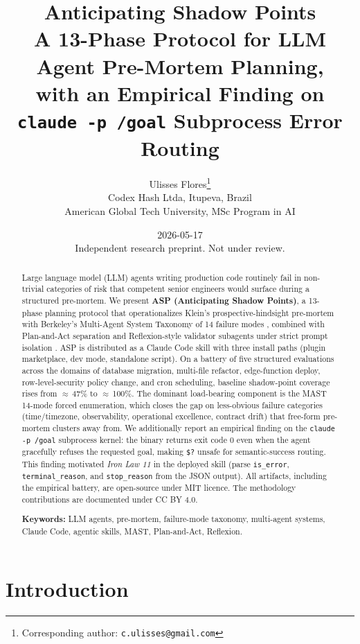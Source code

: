 \documentclass[11pt, a4paper]{article}
\title{
  \textbf{Anticipating Shadow Points}\\
  \large A 13-Phase Protocol for LLM Agent Pre-Mortem Planning,\\
  with an Empirical Finding on \texttt{claude -p /goal} Subprocess Error Routing
}
\author{
  Ulisses Flores\thanks{Corresponding author: \texttt{c.ulisses@gmail.com}}\\
  Codex Hash Ltda, Itupeva, Brazil\\
  American Global Tech University, MSc Program in AI\\
}
\date{2026-05-17\\\small Independent research preprint. Not under review.}
\begin{document}
\maketitle

\begin{abstract}
\noindent
Large language model (LLM) agents writing production code routinely fail in non-trivial categories of risk that competent senior engineers would surface during a structured pre-mortem. We present \textbf{ASP (Anticipating Shadow Points)}, a 13-phase planning protocol that operationalizes Klein's prospective-hindsight pre-mortem \citep{klein2007premortem} with Berkeley's Multi-Agent System Taxonomy of 14 failure modes \citep{cemri2025mast}, combined with Plan-and-Act separation \citep{erdogan2025planandact} and Reflexion-style validator subagents under strict prompt isolation \citep{shinn2023reflexion}. ASP is distributed as a Claude Code skill with three install paths (plugin marketplace, dev mode, standalone script). On a battery of five structured evaluations across the domains of database migration, multi-file refactor, edge-function deploy, row-level-security policy change, and cron scheduling, baseline shadow-point coverage rises from $\approx$\,47\% to $\approx$\,100\%. The dominant load-bearing component is the MAST 14-mode forced enumeration, which closes the gap on less-obvious failure categories (time/timezone, observability, operational excellence, contract drift) that free-form pre-mortem clusters away from. We additionally report an empirical finding on the \texttt{claude -p /goal} subprocess kernel: the binary returns exit code 0 even when the agent gracefully refuses the requested goal, making \texttt{\$?} unsafe for semantic-success routing. This finding motivated \textit{Iron Law 11} in the deployed skill (parse \texttt{is\_error}, \texttt{terminal\_reason}, and \texttt{stop\_reason} from the JSON output). All artifacts, including the empirical battery, are open-source under MIT licence. The methodology contributions are documented under CC BY 4.0.

\medskip
\noindent\textbf{Keywords:} LLM agents, pre-mortem, failure-mode taxonomy, multi-agent systems, Claude Code, agentic skills, MAST, Plan-and-Act, Reflexion.
\end{abstract}

\section{Introduction}
\label{sec:introduction}
\end{document}
